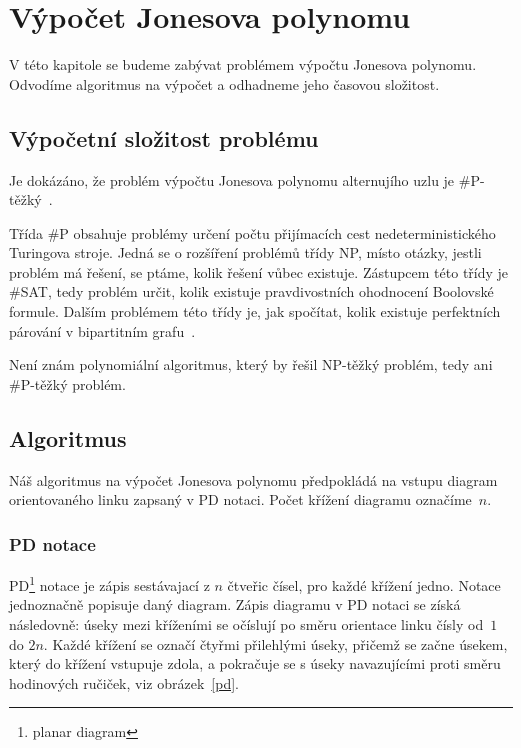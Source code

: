 \chapter{Výpočet Jonesova polynomu}

V této kapitole se budeme zabývat problémem výpočtu Jonesova polynomu. Odvodíme algoritmus na výpočet a odhadneme jeho časovou složitost.

\section{Výpočetní složitost problému} 

Je dokázáno, že problém výpočtu Jonesova polynomu alternujího uzlu je \mbox{\#P-těžký}~\cite{jaeger_vertigan_welsh_1990}. 

Třída \#P obsahuje problémy určení počtu přijímacích cest nedeterministického Turingova stroje. Jedná se o rozšíření problémů třídy NP, místo otázky, jestli problém má řešení, se ptáme, kolik řešení vůbec existuje. Zástupcem této třídy je \#SAT, tedy problém určit, kolik existuje pravdivostních ohodnocení Boolovské formule. Dalším problémem této třídy je, jak spočítat, kolik  existuje perfektních párování v bipartitním grafu~\cite{zoo}.

Není znám polynomiální algoritmus, který by řešil NP-těžký problém, tedy ani \#P-těžký problém.

\section{Algoritmus}
Náš algoritmus na výpočet Jonesova polynomu předpokládá na vstupu diagram orientovaného linku zapsaný v PD notaci. Počet křížení diagramu označíme~$n$.

\subsection{PD notace} 

PD\footnote{planar diagram} notace je zápis sestávajací z $n$  čtveřic čísel, pro každé křížení jedno. Notace jednoznačně popisuje daný diagram. Zápis diagramu v PD notaci se získá následovně: úseky mezi kříženími se očíslují po směru orientace linku čísly od~$1$ do $2 n$. Každé křížení se označí čtyřmi přilehlými úseky, přičemž se začne úsekem, který do křížení vstupuje zdola, a pokračuje se s úseky navazujícími proti směru hodinových ručiček, viz obrázek~\ref{pd}.


